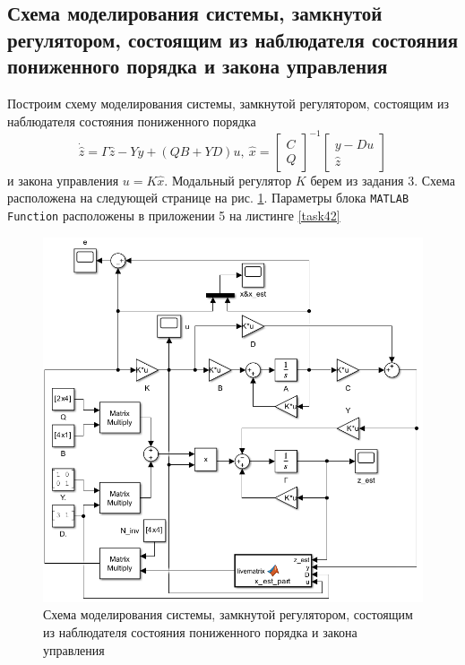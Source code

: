 \documentclass[a4paper, 12pt]{article}
\begin{document}
    \subsection{Схема моделирования системы, замкнутой регулятором, состоящим из наблюдателя состояния пониженного порядка и закона управления}
    Построим схему моделирования системы, замкнутой регулятором, состоящим из
    наблюдателя состояния пониженного порядка $$\dot{\hat{z}}=\Gamma \hat{z}-Yy+\left(QB+YD\right)u,\ \hat{x}=
    \begin{bmatrix}C\\Q\end{bmatrix}^{-1}\begin{bmatrix}y-Du\\ \hat{z}\end{bmatrix}$$ и закона управления $u=K\hat{x}$.
    Модальный регулятор $K$ берем из задания 3. Схема расположена на следующей странице на рис. \ref{fig:scheme_task4}.
    Параметры блока \texttt{MATLAB Function} расположены в приложении 5 на листинге \ref{task42}
    \begin{figure}[H]
        \centering
        \includegraphics[scale=0.8]{scheme_task4.png}
        \captionsetup{skip=0pt}
        \caption{Схема моделирования системы, замкнутой регулятором, состоящим из наблюдателя состояния пониженного порядка и закона управления}
        \label{fig:scheme_task4}
    \end{figure}
\end{document}
